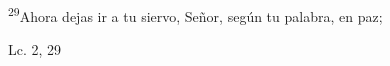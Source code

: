\documentclass[../../rosario.tex]{subfiles}
\begin{document}
    \textsuperscript{29}Ahora dejas ir a tu siervo, Señor, según tu palabra, en paz;
    \begin{flushright}
    Lc. 2, 29        
    \end{flushright}
\end{document}

